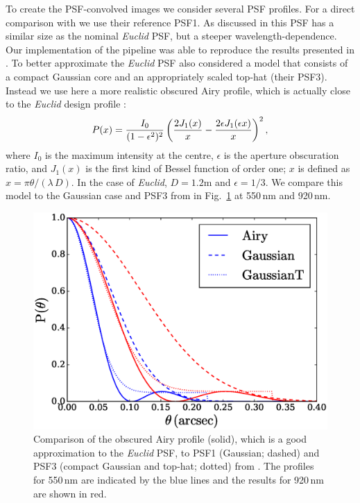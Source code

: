 \documentclass[useAMS,usenatbib]{mnras}
\newcommand{\be}{\begin{equation}}
\newcommand{\ee}{\end{equation}}
\newcommand{\rund}[1]{\left(#1\right)}
\def\elabel#1{\label{eq:#1}}
\begin{document}
To create the PSF-convolved images we consider several PSF profiles. For a direct comparison with  we use their reference PSF1. As discussed in  this PSF has a similar size as the nominal {\it Euclid} PSF, but a steeper wavelength-dependence. Our implementation of the pipeline was able to reproduce the results presented in .
To better approximate the {\it Euclid} PSF  also considered a model that  consists of a compact Gaussian core and an appropriately scaled top-hat (their PSF3). Instead we use here a more realistic obscured Airy profile, which is actually close to the {\it Euclid} design profile \citep{Laureijs11}:
%
\be
P(x) = {I_0 \over (1-\epsilon^2)^2} \rund{{2J_1(x)\over x} -
{2\epsilon J_1(\epsilon x) \over x}}^2,
\elabel{psfairy}
\ee
%
where $I_0$ is the maximum intensity at the centre, $\epsilon$ is the aperture obscuration ratio, and $J_1(x)$ is the first kind of Bessel function of order one; $x$ is defined as $x=\pi \theta/(\lambda\, D) $.
In the case of {\it Euclid}, $D=1.2$m and $\epsilon=1/3$. We compare this model to the Gaussian
case and PSF3 from  in Fig.~\ref{fig:psfmodel} at 550\,nm and 920\,nm.

\begin{figure}
\centerline{\includegraphics[width=\hsize]{zairy.eps}}
\caption{Comparison of the obscured Airy profile (solid), which is a good approximation
to the {\it Euclid} PSF, to PSF1 (Gaussian; dashed) and PSF3 (compact Gaussian and
top-hat; dotted) from . The profiles for 550\,nm are indicated by the blue lines and
the results for 920\,nm are shown in red.}
\label{fig:psfmodel}
\end{figure}
%
\end{document}

